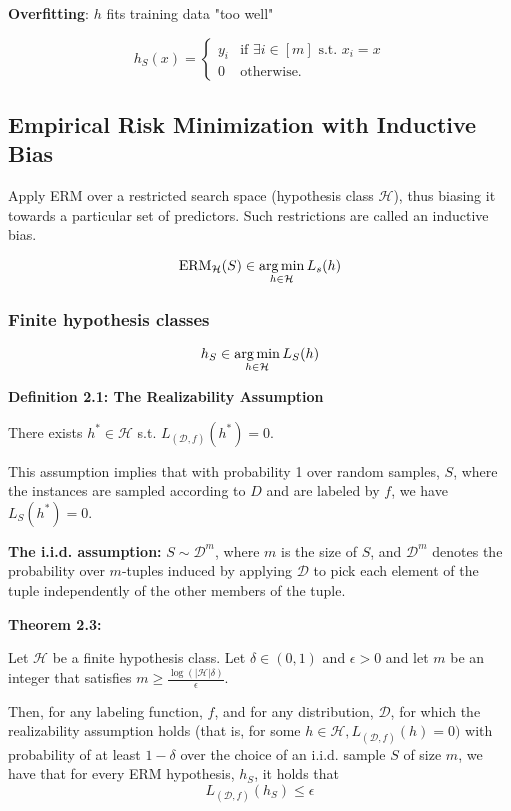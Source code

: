 \textbf{Overfitting}: $h$ fits training data "too well"

\begin{equation*}
    h_S(x) = 
    \begin{cases}
        y_i & \text{if } \exists i \in [m] \text{ s.t. } x_i = x \\
        0 & \text{otherwise.}
    \end{cases}
\end{equation*}

\subsection{Empirical Risk Minimization with Inductive Bias}

Apply ERM over a restricted search space (hypothesis class $\mathcal{H}$), thus biasing it towards a particular set of predictors. Such restrictions are called an inductive bias.

$$\textrm{ERM}_{\mathcal{H}} (S) \in \operatorname*{arg\,min}_{h \in \mathcal{H}} L_s(h)$$

\subsubsection{Finite hypothesis classes}

$$h_S \in \operatorname*{arg\,min}_{h \in \mathcal{H}} L_S(h)$$

\textbf{Definition 2.1: The Realizability Assumption}

There exists $h^* \in \mathcal{H}$ s.t. $L_{(\mathcal{D}, f)}(h^*) = 0$.

This assumption implies that with probability 1 over random samples, $S$, where the instances are sampled according to $D$ and are labeled by $f$, we have $L_S(h^*) = 0$.

\bigskip

\textbf{The i.i.d. assumption:} $S \sim \mathcal{D}^m$, where $m$ is the size of $S$, and $\mathcal{D}^m$ denotes the probability over $m$-tuples induced by applying $\mathcal{D}$ to pick each element of the tuple independently of the other members of the tuple.

\bigskip

\textbf{Theorem 2.3:}

Let $\mathcal{H}$ be a finite hypothesis class. Let $\delta \in (0, 1)$ and $\epsilon > 0$ and let $m$ be an integer that satisfies $m \geq \frac{\log(|\mathcal{H}| \delta)}{\epsilon}$.

Then, for any labeling function, $f$, and for any distribution, $\mathcal{D}$, for which the realizability assumption holds (that is, for some $h \in \mathcal{H}, L_{(\mathcal{D}, f)}(h) = 0)$ with probability of at least $1-\delta$ over the choice of an i.i.d. sample $S$ of size $m$, we have that for every ERM hypothesis, $h_S$, it holds that 
    $$L_{(\mathcal{D}, f)}(h_S) \leq \epsilon$$

